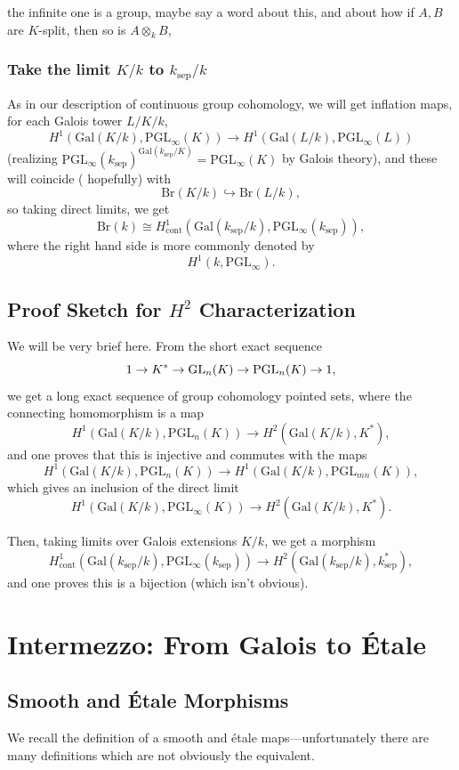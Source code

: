 \documentclass[12pt]{article}
\newcommand{\sep}{\text{sep}}
\newcommand{\Br}{\mathrm{Br}}
\newcommand{\Gal}{\mathrm{Gal}}
\newcommand{\PGL}{\mathrm{PGL}}
\begin{document}
{\color{red} the infinite one is a group, maybe say a word about this, and about how if $A,B$ are $K$-split, then so is $A\otimes_k B$,}

\subsubsection{Take the limit $K/k$ to $k_\sep/k$}

As in our description of continuous group cohomology, we will get inflation maps, for each Galois tower $L/K/k$,
\[H^1(\Gal(K/k),\PGL_\infty(K)) \to H^1(\Gal(L/k),\PGL_\infty(L))\]
(realizing $\PGL_\infty(k_\sep)^{\Gal(k_\sep/K)} = \PGL_\infty(K)$ by Galois theory), and these will coincide ({\color{red} hopefully}) with
\[\Br(K/k) \hookrightarrow \Br(L/k),\]
so taking direct limits, we get
\[\Br(k) \cong H^1_{\text{cont}}(\Gal(k_\sep/k),\PGL_\infty(k_\sep)),\]
where the right hand side is more commonly denoted by
\[H^1(k,\PGL_\infty).\]

\subsection{Proof Sketch for $H^2$ Characterization}

We will be very brief here. From the short exact sequence
\[1\to K^* \to \GL_n(K) \to \PGL_n(K) \to 1,\]
we get a long exact sequence of group cohomology pointed sets, where the connecting homomorphism is a map
\[H^1(\Gal(K/k),\PGL_n(K)) \to H^2(\Gal(K/k), K^*),\]
and one proves that this is injective and commutes with the maps
\[H^1(\Gal(K/k),\PGL_n(K)) \to H^1(\Gal(K/k), \PGL_{mn}(K)),\]
which gives an inclusion of the direct limit
\[H^1(\Gal(K/k),\PGL_\infty(K)) \to H^2(\Gal(K/k), K^*).\]

Then, taking limits over Galois extensions $K/k$, we get a morphism
\[H_{\text{cont}}^1(\Gal(k_\sep/k), \PGL_\infty(k_\sep)) \to H^2(\Gal(k_\sep/k), k_\sep^*),\]
and one proves this is a bijection (which isn't obvious).

\section{Intermezzo: From Galois to \'Etale}

\subsection{Smooth and \'Etale Morphisms}
We recall the definition of a smooth and \'etale maps---unfortunately there are many definitions which are not obviously the equivalent.
\end{document}
